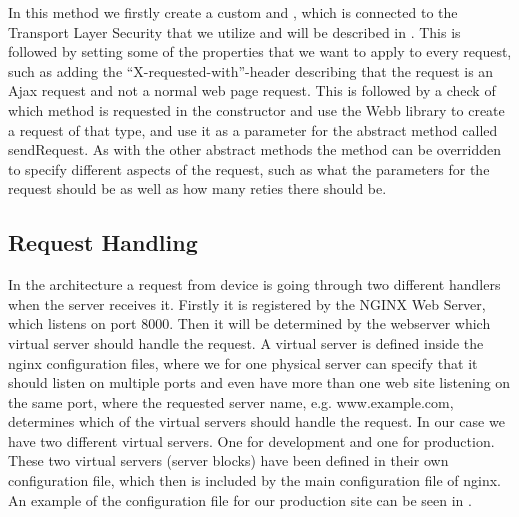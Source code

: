 
\FloatBarrier

In this method we firstly create a custom  and , which is connected to the Transport Layer Security that we utilize and will be described in . This is followed by setting some of the properties that we want to apply to every request, such as adding the ``X-requested-with''-header describing that the request is an Ajax request and not a normal web page request. This is followed by a check of which method is requested in the constructor and use the Webb library to create a request of that type, and use it as a parameter for the abstract method called sendRequest. As with the other abstract methods the  method can be overridden to specify different aspects of the request, such as what the parameters for the request should be as well as how many reties there should be.

\subsection{Request Handling}
\label{sub:request_handling}
In the architecture a request from device is going through two different handlers when the server receives it. Firstly it is registered by the NGINX Web Server, which listens on port 8000. Then it will be determined by the webserver which virtual server should handle the request. A virtual server is defined inside the nginx configuration files, where we for one physical server can specify that it should listen on multiple ports and even have more than one web site listening on the same port, where the requested server name, e.g. www.example.com, determines which of the virtual servers should handle the request. In our case we have two different virtual servers. One for development and one for production. These two virtual servers (server blocks) have been defined in their own configuration file, which then is included by the main configuration file of nginx. An example of the configuration file for our production site can be seen in . 


\FloatBarrier

